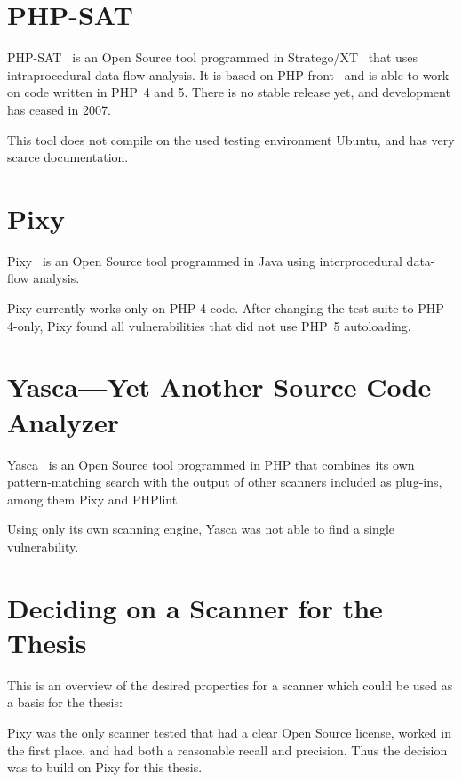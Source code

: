 \section{PHP-SAT}
\label{php-sat}
PHP-SAT~\cite{php-sat} is an Open Source tool programmed in Stratego/XT~\cite{stratego} that uses intraprocedural data-flow analysis. It is based on PHP-front~\cite{php-front} and is able to work on code written in PHP~4 and 5. There is no stable release yet, and development has ceased in 2007.

This tool does not compile on the used testing environment Ubuntu, and has very scarce documentation.

\section{Pixy}
\label{pixy-comparison}
Pixy~\cite{pixy} is an Open Source tool programmed in Java using interprocedural data-flow analysis.

Pixy currently works only on PHP 4 code. After changing the test suite to PHP 4-only, Pixy found all vulnerabilities that did not use PHP~5 autoloading.

\section{Yasca---Yet Another Source Code Analyzer}
\label{yasca}
Yasca~\cite{yasca} is an Open Source tool programmed in PHP that combines its own pattern-matching search with the output of other scanners included as plug-ins, among them Pixy and PHPlint.

Using only its own scanning engine, Yasca was not able to find a single vulnerability.


\section{Deciding on a Scanner for the Thesis}

This is an overview of the desired properties for a scanner which could be used as a basis for the thesis:


Pixy was the only scanner tested that had a clear Open Source license, worked in the first place, and had both a reasonable recall and precision. Thus the decision was to build on Pixy for this thesis.

